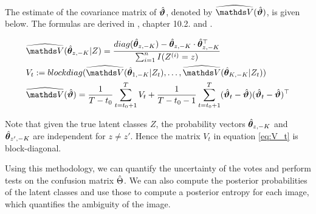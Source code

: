 The estimate of the covariance matrix of $\hat{\bm{\vartheta}}$, denoted by
$\widehat{\V}(\hbvtheta)$, is given below. The formulas are derived in
\cite{littleBayesMultipleImputation2002}, chapter 10.2. and
\cite{hechingerCategorisingWorldLocal2024}.

\begin{align}
    &\widehat{\V}(\hbtheta_{z, -K} | Z) = \frac{diag(\hbtheta_{z, -K}) - \hbtheta_{z, -K} \cdot \hbtheta_{z, -K}^\top}{\sumin I(Z^{(i)} = z)}\\
    &V_t := blockdiag(\widehat{\V}(\hbtheta_{1, -K} | Z_t), \ldots, \widehat{\V}(\hbtheta_{K, -K} | Z_t)) \\ \label{eq:V_t}
    &\widehat{\V}(\hbvtheta) = \frac{1}{T-t_0} \sum_{t=t_0 + 1}^T V_t + \frac{1}{T-t_0-1} \sum_{t=t_0 + 1}^T (\hbvtheta_t - \hbvtheta)(\hbvtheta_t - \hbvtheta)^\top
\end{align}

Note that given the true latent classes $Z$, the probability vectors
$\hat{\bm{\theta}}_{z, -K}$ and $\hat{\bm{\theta}}_{z', -K}$ are independent for $z \neq z'$. Hence
the matrix $V_t$ in equation \ref{eq:V_t} is block-diagonal.\bigskip

Using this methodology, we can quantify the uncertainty of the
votes and perform tests on the confusion matrix $\hat{\Theta}$. We can
also compute the posterior probabilities of the latent classes and use
those to compute a posterior entropy for each image, which quantifies the
ambiguity of the image.



